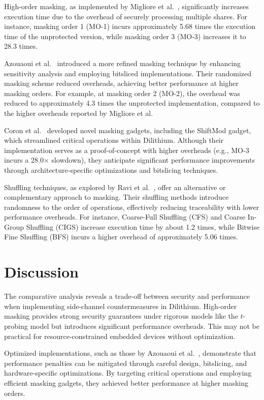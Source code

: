 High-order masking, as implemented by Migliore et al.~\cite{Migliore19}, significantly increases execution time due to the overhead of securely processing multiple shares. For instance, masking order 1 (MO-1) incurs approximately 5.68 times the execution time of the unprotected version, while masking order 3 (MO-3) increases it to 28.3 times.

Azouaoui et al.~\cite{Azouaoui22} introduced a more refined masking technique by enhancing sensitivity analysis and employing bitsliced implementations. Their randomized masking scheme reduced overheads, achieving better performance at higher masking orders. For example, at masking order 2 (MO-2), the overhead was reduced to approximately 4.3 times the unprotected implementation, compared to the higher overheads reported by Migliore et al.

Coron et al.~\cite{Coron23} developed novel masking gadgets, including the ShiftMod gadget, which streamlined critical operations within Dilithium. Although their implementation serves as a proof-of-concept with higher overheads (e.g., MO-3 incurs a 28.0× slowdown), they anticipate significant performance improvements through architecture-specific optimizations and bitslicing techniques.

Shuffling techniques, as explored by Ravi et al.~\cite{Ravi20}, offer an alternative or complementary approach to masking. Their shuffling methods introduce randomness to the order of operations, effectively reducing traceability with lower performance overheads. For instance, Coarse-Full Shuffling (CFS) and Coarse In-Group Shuffling (CIGS) increase execution time by about 1.2 times, while Bitwise Fine Shuffling (BFS) incurs a higher overhead of approximately 5.06 times.

\section{Discussion}

The comparative analysis reveals a trade-off between security and performance when implementing side-channel countermeasures in Dilithium. High-order masking provides strong security guarantees under rigorous models like the $t$-probing model but introduces significant performance overheads. This may not be practical for resource-constrained embedded devices without optimization.

Optimized implementations, such as those by Azouaoui et al.~\cite{Azouaoui22}, demonstrate that performance penalties can be mitigated through careful design, bitslicing, and hardware-specific optimizations. By targeting critical operations and employing efficient masking gadgets, they achieved better performance at higher masking orders.

